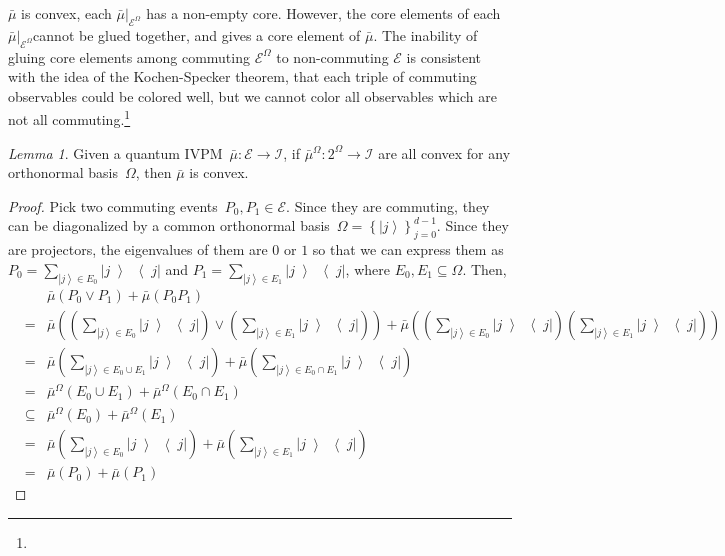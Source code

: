 \documentclass{article}
\theoremstyle{remark}
\newtheorem{lemma}{Lemma}
\newcommand{\events}{\ensuremath{\mathcal{E}}}
\newcommand{\ket}[1]{{\left\vert{#1}\right\rangle}}
\newcommand{\op}[2]{\ensuremath{\left\vert{#1}\middle\rangle\middle\langle{#2}\right\vert}}
\newcommand{\proj}[1]{\op{#1}{#1}}
\newcommand{\yutsung}[1]{\fbox{\begin{minipage}{0.9\textwidth}\color{purple}{Yu-Tsung says: #1}\end{minipage}}}
\begin{document}
$\bar{\mu}$ is convex, each $\bar{\mu}|_{\events^{\Omega}}$ has
a non-empty core. However, the core elements of each $\bar{\mu}|_{\events^{\Omega}}$cannot
be glued together, and gives a core element of $\bar{\mu}$. The inability
of gluing core elements among commuting $\events^{\Omega}$ to non-commuting
$\events$ is consistent with the idea of the Kochen-Specker theorem,
that each triple of commuting observables could be colored well, but
we cannot color all observables which are not all commuting.\footnote{\yutsung{Since Bell's theorem only applies to entangled states, the
exists of entangled states is another reason why quantum theory is
different from a classical theory. However, defining product quantum
IVPM is much harder, and beyond the discussion here.}}

\begin{lemma}Given a quantum IVPM~$\bar{\mu}:\events\rightarrow\mathscr{I}$,
if $\bar{\mu}^{\Omega}:2^{\Omega}\rightarrow\mathscr{I}$ are all
convex for any orthonormal basis~$\Omega$, then $\bar{\mu}$ is
convex.\end{lemma}
\begin{proof}
Pick two commuting events~$P_{0},P_{1}\in\events$. Since they are
commuting, they can be diagonalized by a common orthonormal basis~$\Omega=\left\{ \ket{j}\right\} _{j=0}^{d-1}$.
Since they are projectors, the eigenvalues of them are $0$ or $1$
so that we can express them as $P_{0}=\sum_{\ket{j}\in E_{0}}\proj{j}$
and $P_{1}=\sum_{\ket{j}\in E_{1}}\proj{j}$, where $E_{0},E_{1}\subseteq\Omega$.
Then, 
\begin{eqnarray*}
 &  & \bar{\mu}\left(P_{0}\vee P_{1}\right)+\bar{\mu}\left(P_{0}P_{1}\right)\\
 & = & \bar{\mu}\left(\left(\sum_{\ket{j}\in E_{0}}\proj{j}\right)\vee\left(\sum_{\ket{j}\in E_{1}}\proj{j}\right)\right)+\bar{\mu}\left(\left(\sum_{\ket{j}\in E_{0}}\proj{j}\right)\left(\sum_{\ket{j}\in E_{1}}\proj{j}\right)\right)\\
 & = & \bar{\mu}\left(\sum_{\ket{j}\in E_{0}\cup E_{1}}\proj{j}\right)+\bar{\mu}\left(\sum_{\ket{j}\in E_{0}\cap E_{1}}\proj{j}\right)\\
 & = & \bar{\mu}^{\Omega}\left(E_{0}\cup E_{1}\right)+\bar{\mu}^{\Omega}\left(E_{0}\cap E_{1}\right)\\
 & \subseteq & \bar{\mu}^{\Omega}\left(E_{0}\right)+\bar{\mu}^{\Omega}\left(E_{1}\right)\\
 & = & \bar{\mu}\left(\sum_{\ket{j}\in E_{0}}\proj{j}\right)+\bar{\mu}\left(\sum_{\ket{j}\in E_{1}}\proj{j}\right)\\
 & = & \bar{\mu}\left(P_{0}\right)+\bar{\mu}\left(P_{1}\right)
\end{eqnarray*}
\end{proof}
\end{document}
